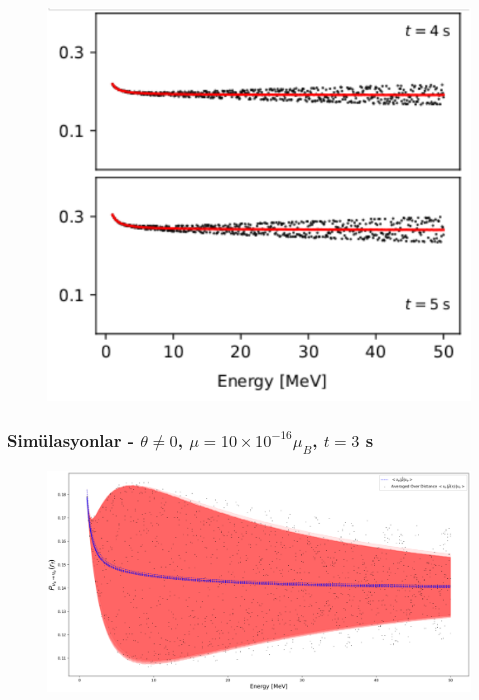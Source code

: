 \documentclass[10pt]{beamer}
\begin{document}
\begin{frame}
\begin{minipage}{0.45\textwidth}
\begin{figure}[hbt!]
            \includegraphics[width=\textwidth]{fig/8_2.pdf}
        \end{figure}
    \end{minipage}
\end{frame}

\begin{frame}
    \frametitle{Simülasyonlar - $\theta\ne0$, $\mu=10\times10^{-16}\mu_{B}$, $t=3$ s}
    \begin{figure}[hbt!]
        \centering
        \includegraphics[width=\textwidth]{fig/theta014expNbB_energySpec_theta0_averaged.pdf}
    \end{figure}
\end{frame}
\end{document}
